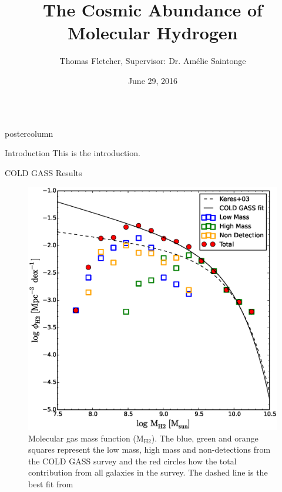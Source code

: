 \documentclass{beamer}
\title{\huge The Cosmic Abundance of Molecular Hydrogen}
\author{Thomas Fletcher, Supervisor: Dr. Amélie Saintonge}
\institute{Department of Physics and Astronomy, University College London}
\date{June 29, 2016}
\newlength{\columnheight}
\begin{document}
\begin{frame}
\begin{columns}
	\begin{column}{.5\textwidth}
		\begin{beamercolorbox}[center,wd=\textwidth]{postercolumn}
			\begin{minipage}[T]{.95\textwidth}  %
				\parbox[t][\columnheight]{\textwidth}{ %
					\begin{myblock}{\LARGE Introduction}
						This is the introduction. \cite{keres2003co}
					\end{myblock}\vfill
					\begin{myblock}{\LARGE COLD GASS Results}
						\begin{figure}[H]
						  \centering
						  \includegraphics[width=\textwidth]{img/MH2.eps}
						  \caption{Molecular gas mass function ($\mathrm{M_{H2}}$).
							The blue, green and orange squares represent the low mass, high
							mass and non-detections from the COLD GASS survey and the red
							circles how the total contribution from all galaxies in the
							survey. The dashed line is the best fit from \cite{keres2003co}
}
\end{figure}
\end{myblock}}
\end{minipage}
\end{beamercolorbox}
\end{column}
\end{columns}
\end{frame}
\end{document}
